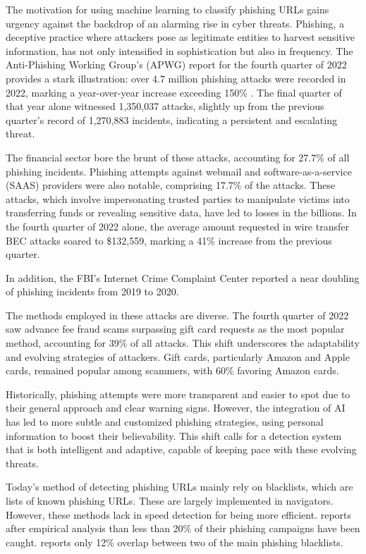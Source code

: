 \documentclass{article}
\begin{document}
    The motivation for using machine learning to classify phishing URLs gains urgency against the backdrop of an alarming rise in cyber threats.
    Phishing, a deceptive practice where attackers pose as legitimate entities to harvest sensitive information, has not only intensified in sophistication but also in frequency.
    The Anti-Phishing Working Group's (APWG) report for the fourth quarter of 2022 provides a stark illustration: over 4.7 million phishing attacks were recorded in 2022, marking a year-over-year increase exceeding 150\% \cite{PhishingActivityTrendsReport}.
    The final quarter of that year alone witnessed 1,350,037 attacks, slightly up from the previous quarter's record of 1,270,883 incidents, indicating a persistent and escalating threat.

    The financial sector bore the brunt of these attacks, accounting for 27.7\% of all phishing incidents.
    Phishing attempts against webmail and software-as-a-service (SAAS) providers were also notable, comprising 17.7\% of the attacks.
    These attacks, which involve impersonating trusted parties to manipulate victims into transferring funds or revealing sensitive data, have led to losses in the billions.
    In the fourth quarter of 2022 alone, the average amount requested in wire transfer BEC attacks soared to \$132,559, marking a 41\% increase from the previous quarter.

    In addition, the FBI’s Internet Crime Complaint Center reported a near doubling of phishing incidents from 2019 to 2020.

    The methods employed in these attacks are diverse.
    The fourth quarter of 2022 saw advance fee fraud scams surpassing gift card requests as the most popular method, accounting for 39\% of all attacks.
    This shift underscores the adaptability and evolving strategies of attackers.
    Gift cards, particularly Amazon and Apple cards, remained popular among scammers, with 60\% favoring Amazon cards.

    Historically, phishing attempts were more transparent and easier to spot due to their general approach and clear warning signs.
    However, the integration of AI has led to more subtle and customized phishing strategies, using personal information to boost their believability.
    This shift calls for a detection system that is both intelligent and adaptive, capable of keeping pace with these evolving threats.

    Today's method of detecting phishing URLs mainly rely on blacklists, which are lists of known phishing URLs.
    These are largely implemented in navigators.
    However, these methods lack in speed detection for being more efficient.
    \cite{PhishingExperimentalBlackLists2009} reports after empirical analysis than less than 20\% of their phishing campaigns have been caught.
    \cite{PhishingBlackLists} reports only 12\% overlap between two of the main phishing blacklists.
\end{document}
